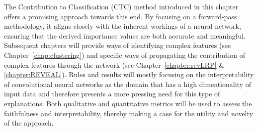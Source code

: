The Contribution to Classification (CTC) method introduced in this chapter offers a promising approach towards this end. By focusing on a forward-pass methodology, it aligns closely with the inherent workings of a neural network, ensuring that the derived importance values are both accurate and meaningful. Subsequent chapters will provide ways of identifying complex features (see Chapter~\ref{chap:clustering}) and specific ways of propagating the contribution of complex features through the network (see Chapter~\ref{chapter:revLRP} \& \ref{chapter:REVEAL}). Rules and results will mostly focusing on the interpretability of convolutional neural networks as the domain that has a high dimentionality of input data and therefore presents a more pressing need for this type of explanations. Both qualitative and quantitative metrics will be used to assess the faithfulness and interpretability, thereby making a case for the utility and novelty of the approach.


